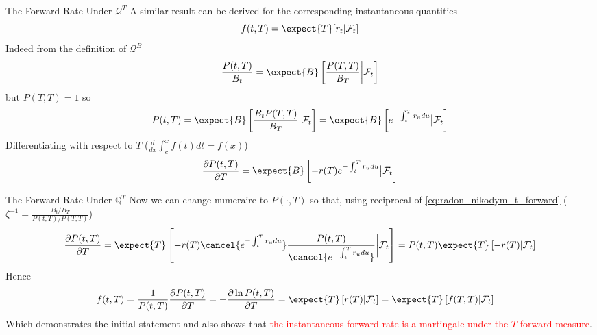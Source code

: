 \documentclass{beamer}
\begin{document}
\begin{frame}{The Forward Rate Under $\mathcal{Q}^T$}
  A similar result can be derived for the corresponding instantaneous quantities
  \begin{equation}
    f(t,T)=\expect{T}[r_t|\mathcal{F}_t]
  \end{equation}
	\pause
  Indeed from the definition of $\mathcal{Q}^B$
  \begin{equation*}
    \frac{P(t,T)}{B_t}=\expect{B}\left[\frac{P(T,T)}{B_T}\bigg|\mathcal{F}_t\right]
  \end{equation*}
  but $P(T,T)=1$ so
  \begin{equation*}
    P(t,T)=\expect{B}\left[\frac{B_tP(T,T)}{B_T}\bigg|\mathcal{F}_t\right]=\expect{B}\left[e^{-\int_t^Tr_u du}\big|\mathcal{F}_t\right]
  \end{equation*}
	\pause
  Differentiating with respect to $T$ ($\frac{d}{dx}\int_c^x f(t)dt=f(x)$)
  \begin{equation*}
    \frac{\partial P(t,T)}{\partial T}=
    \expect{B}\left[-r(T)e^{-\int_t^Tr_u du}\big|\mathcal{F}_t\right]
  \end{equation*}
\end{frame}

\begin{frame}{The Forward Rate Under $\mathbb{Q}^T$}
  Now we can change numeraire to $P(\cdot,T)$ so that, using reciprocal of \cref{eq:radon_nikodym_t_forward} ($\zeta^{-1}=\frac{B_t/B_T}{P(t,T)/P(T,T)}$)
  \begin{equation*}
    \frac{\partial P(t,T)}{\partial T}=
    \expect{T}\left[-r(T)\cancel{e^{-\int_t^Tr_u du}}\frac{P(t,T)}{\cancel{e^{-\int_t^Tr_u du}}}\bigg|\mathcal{F}_t\right]=
    P(t,T)\expect{T}\left[-r(T)|\mathcal{F}_t\right]
  \end{equation*}
	\pause
  Hence
  \begin{equation*}
    \begin{aligned}
      f(t,T)&=\frac{1}{P(t,T)}\frac{\partial P(t,T)}{\partial T}=
      -\frac{\partial \ln P(t,T)}{\partial T}
      = \expect{T}\left[r(T)|\mathcal{F}_t\right]=	\expect{T}\left[f(T,T)|\mathcal{F}_t\right]
    \end{aligned}
  \end{equation*}
  Which demonstrates the initial statement and also shows that \textcolor{red}{the instantaneous forward rate is a martingale under the $T$-forward measure}.
\end{frame}
\end{document}
